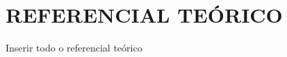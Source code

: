 \newpage

\section{REFERENCIAL TEÓRICO}
\label{sec:referencial-teórico}
Inserir todo o referencial teórico